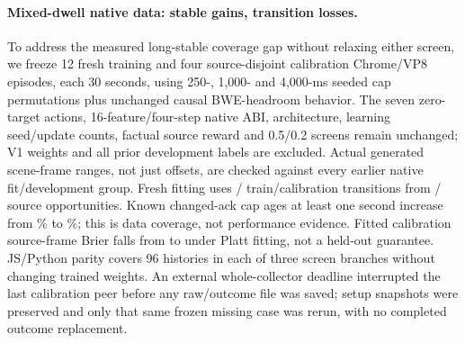 \documentclass[10pt]{article}
\begin{document}
\paragraph{Mixed-dwell native data: stable gains, transition losses.}
To address the measured long-stable coverage gap without relaxing either screen, we freeze 12 fresh training and four source-disjoint calibration Chrome/VP8 episodes, each 30 seconds, using 250-, 1,000- and 4,000-ms seeded cap permutations plus unchanged causal BWE-headroom behavior. The seven zero-target actions, 16-feature/four-step native ABI, architecture, learning seed/update counts, factual source reward and 0.5/0.2 screens remain unchanged; V1 weights and all prior development labels are excluded. Actual generated scene-frame ranges, not just offsets, are checked against every earlier native fit/development group. Fresh fitting uses \NativeMixedTrainTransitions{} / \NativeMixedCalibrationTransitions{} train/calibration transitions from \NativeMixedTrainRequests{} / \NativeMixedCalibrationRequests{} source opportunities. Known changed-ack cap ages at least one second increase from \NativeMixedOldLongCoverage{}\% to \NativeMixedNewLongCoverage{}\%; this is data coverage, not performance evidence. Fitted calibration source-frame Brier falls from \NativeMixedBrierRaw{} to \NativeMixedBrierPlatt{} under Platt fitting, not a held-out guarantee. JS/Python parity covers 96 histories in each of three screen branches without changing trained weights. An external whole-collector deadline interrupted the last calibration peer before any raw/outcome file was saved; setup snapshots were preserved and only that same frozen missing case was rerun, with no completed outcome replacement.
\end{document}
